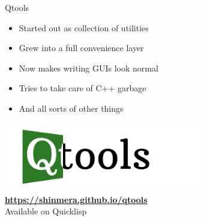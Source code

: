 \documentclass{beamer}
\newcommand{\toptitle}[1]{
  {\Huge #1} \\
  \vspace{0.2cm}
}
\begin{document}
\begin{frame}
  \toptitle{Qtools}
  \begin{itemize}
  \item Started out as collection of utilities
  \item Grew into a full convenience layer
  \item Now makes writing GUIs look normal
  \item Tries to take care of C++ garbage
  \item And all sorts of other things
  \end{itemize}
\end{frame}

\begin{frame}
  \begin{center}
    \hskip1.2cm\includegraphics[height=3cm]{qtools-logo.png} \\
    {\Large\bfseries \url{https://shinmera.github.io/qtools}} \\
    \vspace{0.2cm}
    {\Large Available on Quicklisp}
  \end{center}
\end{frame}
\end{document}
